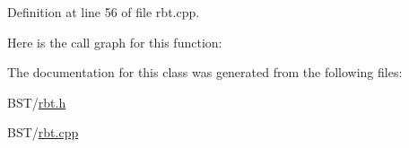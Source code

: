 Definition at line 56 of file rbt.\+cpp.



Here is the call graph for this function\+:




The documentation for this class was generated from the following files\+:\begin{DoxyCompactItemize}
\item 
B\+S\+T/\hyperlink{rbt_8h}{rbt.\+h}\item 
B\+S\+T/\hyperlink{rbt_8cpp}{rbt.\+cpp}\end{DoxyCompactItemize}
